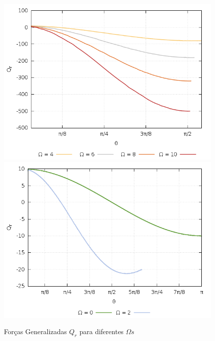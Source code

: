 \documentclass[a4paper,11pt]{exam}
\begin{document}
	\begin{figure}[h]
			\centering
			\includegraphics[scale=0.35]{Gr6.png}
			\includegraphics[scale=0.35]{Gr7.png}
			\caption{Forças Generalizadas $Q_r$ para diferentes $\Omega s$}
	\end{figure}
	
	\pagebreak
	
\end{document}
